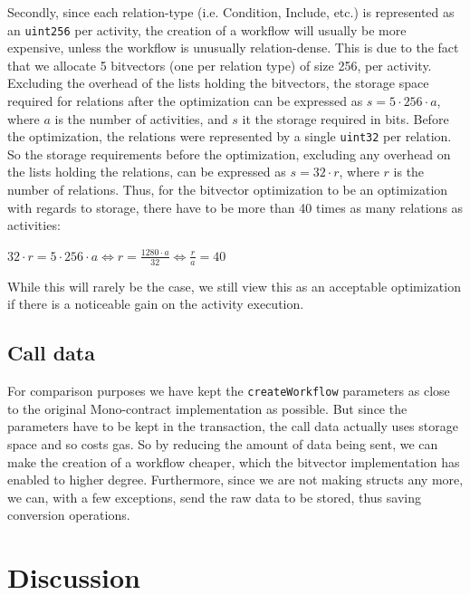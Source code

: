 \documentclass{article}
\begin{document}
		Secondly, since each relation-type (i.e. Condition, Include, etc.) is represented as an \texttt{uint256} per activity, the creation of a workflow will usually be more expensive, unless the workflow is unusually relation-dense. 
		This is due to the fact that we allocate 5 bitvectors (one per relation type) of size 256, per activity. 
		Excluding the overhead of the lists holding the bitvectors, the storage space required for relations after the optimization can be expressed as $s = 5 \cdot 256 \cdot a$, where $a$ is the number of activities, and $s$ it the storage required in bits.
		Before the optimization, the relations were represented by a single \texttt{uint32} per relation.
		So the storage requirements before the optimization, excluding any overhead on the lists holding the relations, can be expressed as $s = 32 \cdot r$, where $r$ is the number of relations.
		Thus, for the bitvector optimization to be an optimization with regards to storage, there have to be more than 40 times as many relations as activities:

		\begin{center}		
			$32 \cdot r = 5 \cdot 256 \cdot a \iff r = \frac{1280 \cdot a}{32} \iff \frac{r}{a} = 40$
		\end{center}
		
		While this will rarely be the case, we still view this as an acceptable optimization if there is a noticeable gain on the activity execution.

		\subsection{Call data}
		For comparison purposes we have kept the \texttt{createWorkflow} parameters as close to the original Mono-contract implementation as possible. 
		But since the parameters have to be kept in the transaction, the call data actually uses storage space and so costs gas.
		So by reducing the amount of data being sent, we can make the creation of a workflow cheaper, which the bitvector implementation has enabled to higher degree. 
		Furthermore, since we are not making structs any more, we can, with a few exceptions, send the raw data to be stored, thus saving conversion operations. 

	\section{Discussion}
\end{document}
